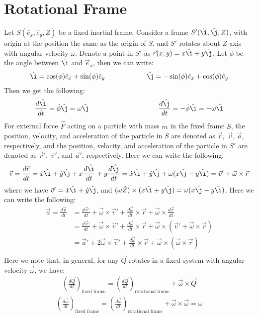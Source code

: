 \documentclass[11pt,oneside]{book}
\theoremstyle{break}
\theoremstyle{break}
\newcommand{\ihat}{\hat{\i}}
\newcommand{\jhat}{\hat{\j}}
\begin{document}
\section[Rotational Frame]{\color{red} Rotational Frame\color{black}}
Let $S(\hat{e}_x,\hat{e}_y,Z)$ be a fixed inertial frame. Consider a frame $S'(\ihat,\jhat,Z)$, with origin at the position the same as the origin of $S$, and $S'$ rotates about $Z$-axis with angular velocity $\omega$. Denote a point in $S'$ as $\vec{r}(x,y) = x \ihat + y \jhat$. Let $\phi$ be the angle between $\ihat$ and $\vec{e}_x$, then we can write:
\begin{align*}
\ihat  = \cos(\phi) \hat{e}_x + \sin(\phi) \hat{e}_y \qquad\qquad\qquad \jhat = -\sin(\phi)\hat{e}_x + \cos(\phi) \hat{e}_y
\end{align*}
Then we get the following:
\begin{align*}
\frac{d\ihat}{dt} = \dot{\phi} \jhat = \omega \jhat \qquad\qquad\qquad\qquad\qquad \frac{d\jhat}{dt} = -\dot{\phi}\ihat = -\omega \ihat
\end{align*}
For external force $\vec{F}$ acting on a particle with mass $m$ in the fixed frame $S$, the position, velocity, and acceleration of the particle in $S$ are denoted as $\vec{r},$ $\vec{v}$, $\vec{a}$, respectively, and the position, velocity, and acceleration of the particle in $S'$ are denoted as $\vec{r}'$, $\vec{v}'$, and $\vec{a}'$, respectively. Here we can write the following:
\begin{align*}
\vec{v} = \frac{d\vec{r}}{dt} = \dot{x}\ihat + \dot{y}\jhat + x \frac{d\ihat}{dt}+ y \frac{d\jhat}{dt} = \dot{x}\ihat + \dot{y}\jhat + \omega(x\jhat - y\ihat) = \vec{v}' + \vec{\omega}\times \vec{r}
\end{align*}
where we have $\vec{v}' = \dot{x}\ihat + \dot{y}\jhat$, and $(\omega \hat{Z} )\times (x\ihat + y\jhat) = \omega (x\jhat - y\ihat)$. Here we can write the following:
\begin{align*}
\vec{a} = \frac{d\vec{v}}{dt} &= \frac{d\vec{v}'}{dt} + \vec{\omega}\times \vec{v}' + \frac{d\vec{\omega}}{dt} \times \vec{r}+ \vec{\omega }\times \frac{d\vec{r}}{dt}\\
&= \frac{d\vec{v}'}{dt} + \vec{\omega}\times \vec{v}' + \frac{d\vec{\omega}}{dt} \times \vec{r}+ \vec{\omega }\times (\vec{v}' + \vec{\omega}\times \vec{r})\\
&=\vec{a}' + 2\vec{\omega}\times \vec{v}' + \frac{d\vec{\omega}}{dt} \times \vec{r}+ \vec{\omega }\times (\vec{\omega}\times \vec{r})\\
\tag{AF}
\end{align*}
Here we note that, in general, for any $\vec{Q}$ rotates in a fixed system with angular velocity $\vec{\omega}$, we have:
\begin{align*}
\left(\frac{d\vec{Q}}{dt} \right)_{\text{fixed frame}} = \left(\frac{d\vec{Q}}{dt} \right)_{\text{rotational frame}} + \vec{\omega}\times \vec{Q} \tag{RF}
\end{align*}
\begin{align*}
\left(\frac{d\vec{\omega}}{dt} \right)_{\text{fixed frame}} = \left(\frac{d\vec{\omega}}{dt} \right)_{\text{rotational frame}} + \vec{\omega}\times \vec{\omega} = \dot{\omega}
\end{align*}
\end{document}
